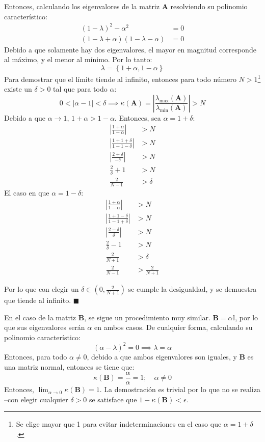 \documentclass[11pt]{article}
\begin{document}
Entonces, calculando los eigenvalores de la matriz \(\mathbf{A}\)
resolviendo su polinomio característico: \[\begin{align*}
(1-\lambda)^2-\alpha^2 &= 0 \\
(1-\lambda+\alpha)(1-\lambda-\alpha) &= 0
\end{align*}\] Debido a que solamente hay dos eigenvalores, el mayor en
magnitud corresponde al máximo, y el menor al mínimo. Por lo tanto:
\[\lambda = \left\{1+\alpha,1-\alpha\right\}\] Para demostrar que el
límite tiende al infinito, entonces para todo número \(N>1\)\footnote{Se
  elige mayor que 1 para evitar indeterminaciones en el caso que
  \(\alpha = 1+\delta\).} existe un \(\delta>0\) tal que para todo
\(\alpha\):
\[0<|\alpha-1|<\delta \implies \kappa(\mathbf{A}) = \left|\frac{\lambda_{\max}(\mathbf{A})}{\lambda_{\min}(\mathbf{A})}\right| > N \]
Debido a que \(\alpha\rightarrow1\), \(1+\alpha>1-\alpha\). Entonces,
sea \(\alpha = 1+\delta\): \[\begin{align*}
\left|\frac{1+\alpha}{1-\alpha}\right| &> N \\
\left|\frac{1+1+\delta}{1-1-\delta}\right| &> N \\
\left|\frac{2+\delta}{-\delta}\right| &> N \\
\frac{2}{\delta}+1 &>N \\
\frac{2}{N-1} &> \delta
\end{align*}\] El caso en que \(\alpha = 1-\delta\): \[\begin{align*}
\left|\frac{1+\alpha}{1-\alpha}\right| &> N \\
\left|\frac{1+1-\delta}{1-1+\delta}\right| &> N \\
\left|\frac{2-\delta}{\delta}\right| &> N \\
\frac{2}{\delta}-1 &>N \\
\frac{2}{N+1} &> \delta \\
\frac{2}{N-1} &> \frac{2}{N+1}
\end{align*}\]

Por lo que con elegir un \(\delta \in (0,\frac{2}{N+1})\) se cumple la
desigualdad, y se demuestra que tiende al infinito. \(\blacksquare\)

En el caso de la matriz \(\mathbf{B}\), se sigue un procedimiento muy
similar. \(\mathbf{B} = \alpha\mathbb{I}\), por lo que sus eigenvalores
serán \(\alpha\) en ambos casos. De cualquier forma, calculando su
polinomio característico:
\[(\alpha-\lambda)^2 = 0\implies \lambda = \alpha\] Entonces, para todo
\(\alpha \ne 0\), debido a que ambos eigenvalores son iguales, y
\(\mathbf{B}\) es una matriz normal, entonces se tiene que:
\[\kappa(\mathbf{B}) = \frac{\alpha}{\alpha} = 1;\quad {\alpha\ne0}\]
Entonces, \(\lim_{\alpha\rightarrow0}\kappa(\mathbf{B}) =1\). La
demostración es trivial por lo que no se realiza --con elegir cualquier
\(\delta>0\) se satisface que \(1-\kappa(\mathbf{B})<\epsilon\).
\end{document}
